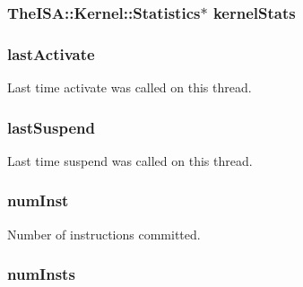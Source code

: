 \label{structThreadState_a344acde4f72898017365be79fd18a323}
\hypertarget{structThreadState_af94097bd19d2f3145ab6aececf25815c}{
\subsubsection[{kernelStats}]{\setlength{\rightskip}{0pt plus 5cm}TheISA::Kernel::Statistics$\ast$ {\bf kernelStats}}}
\label{structThreadState_af94097bd19d2f3145ab6aececf25815c}
\hypertarget{structThreadState_adba46356f3cbff06bc296a0cf84453e8}{
\subsubsection[{lastActivate}]{ {\bf lastActivate}}}
\label{structThreadState_adba46356f3cbff06bc296a0cf84453e8}
Last time activate was called on this thread. \hypertarget{structThreadState_ac2a3eaa24ceabac390386cca70cc0aa3}{
\subsubsection[{lastSuspend}]{ {\bf lastSuspend}}}
\label{structThreadState_ac2a3eaa24ceabac390386cca70cc0aa3}
Last time suspend was called on this thread. \hypertarget{structThreadState_a1431f3f73435dd9b1c68e7e3a303ada0}{
\subsubsection[{numInst}]{ {\bf numInst}}}
\label{structThreadState_a1431f3f73435dd9b1c68e7e3a303ada0}
Number of instructions committed. \hypertarget{structThreadState_a302bf9a6fd3b54c46eb3e2bfb18a320e}{
\subsubsection[{numInsts}]{ {\bf numInsts}}}
